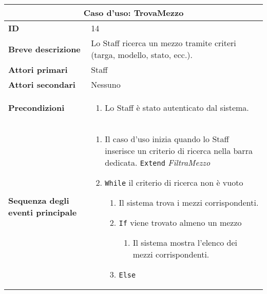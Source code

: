 \documentclass[a4paper]{report}
\begin{document}
\clearpage
\begin{table}[H]
\vspace*{-0cm}
\renewcommand{\arraystretch}{1.9}
\begin{tabular}{|p{3.9cm}|p{9.9cm}|}
\hline
\multicolumn{2}{|c|}{\textbf{Caso d’uso: TrovaMezzo}} \\ \hline
	\textbf{ID} & 14 \\ \hline
	\textbf{Breve descrizione} & Lo Staff ricerca un mezzo tramite criteri (targa, modello, stato, ecc.). \\ \hline
	\textbf{Attori primari} & Staff \\ \hline
	\textbf{Attori secondari} & Nessuno \\ \hline
	\textbf{Precondizioni} & \begin{enumerate}[label=\arabic*.,leftmargin=14pt,labelsep=0.5em,topsep=0pt,partopsep=0pt,parsep=0pt,itemsep=0pt]
        \item Lo Staff è stato autenticato dal sistema.
    \end{enumerate} \\ \hline
	\textbf{Sequenza degli eventi principale} & 
\begin{enumerate}[leftmargin=14pt,label=\arabic*.,labelsep=0.5em,topsep=0pt,partopsep=0pt,parsep=0pt,itemsep=0pt]
    \item Il caso d’uso inizia quando lo Staff inserisce un criterio di ricerca nella barra dedicata. \newline 
    \texttt{Extend} \textit{FiltraMezzo}
    \item \texttt{While} il criterio di ricerca non è vuoto
    \begin{enumerate}[label=\arabic{enumi}.\arabic*.,leftmargin=22pt,labelsep=0.5em,topsep=0pt,partopsep=0pt,parsep=0pt,itemsep=0pt]
        \item Il sistema trova i mezzi corrispondenti.
        \item \texttt{If} viene trovato almeno un mezzo
        \begin{enumerate}[label=\arabic{enumi}.\arabic{enumii}.\arabic*.,leftmargin=22pt,labelsep=0.5em,topsep=0pt,partopsep=0pt,parsep=0pt,itemsep=0pt]
            \item Il sistema mostra l’elenco dei mezzi corrispondenti.
        \end{enumerate}
        \item \texttt{Else}
        \begin{enumerate}[label=\arabic{enumi}.\arabic{enumii}.\arabic*.,leftmargin=22pt,labelsep=0.5em,topsep=0pt,partopsep=0pt,parsep=0pt,itemsep=0pt]

\end{enumerate}
\end{enumerate}
\end{enumerate}
\end{tabular}
\end{table}
\end{document}
